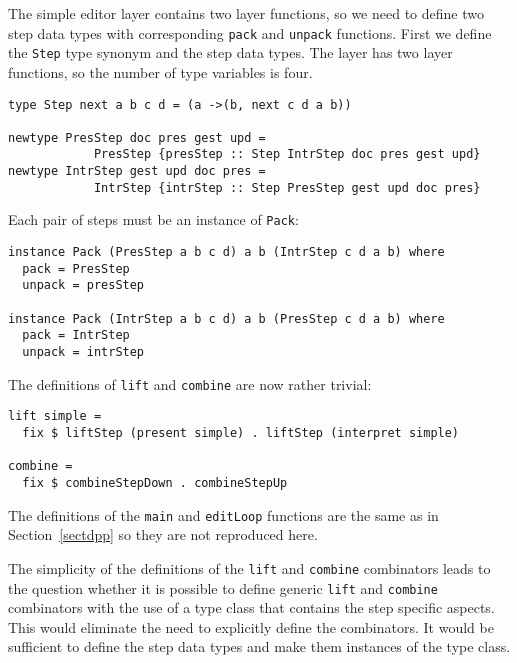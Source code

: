 The simple editor layer contains two layer functions, so we need to define two step data types with corresponding \texttt{pack} and \texttt{unpack} functions. First we define the \texttt{Step} type synonym and the step data types. The layer has two layer functions, so the number of type variables is four.

\begin{small}
\begin{verbatim}
type Step next a b c d = (a ->(b, next c d a b))

newtype PresStep doc pres gest upd = 
            PresStep {presStep :: Step IntrStep doc pres gest upd}
newtype IntrStep gest upd doc pres = 
            IntrStep {intrStep :: Step PresStep gest upd doc pres}
\end{verbatim}
\end{small}

Each pair of steps must be an instance of \texttt{Pack}: 

\begin{small}
\begin{verbatim}
instance Pack (PresStep a b c d) a b (IntrStep c d a b) where
  pack = PresStep
  unpack = presStep

instance Pack (IntrStep a b c d) a b (PresStep c d a b) where
  pack = IntrStep
  unpack = intrStep
\end{verbatim}
\end{small}

The definitions of \texttt{lift} and \texttt{combine} are now rather trivial:

\begin{small}
\begin{verbatim}
lift simple =
  fix $ liftStep (present simple) . liftStep (interpret simple)

combine = 
  fix $ combineStepDown . combineStepUp
\end{verbatim}
\end{small}

The definitions of the \texttt{main} and \texttt{editLoop} functions are the same as in Section~\ref{sectdpp} so they are not reproduced here.



The simplicity of the definitions of the \texttt{lift} and \texttt{combine} combinators leads to the question whether it is possible to define generic \texttt{lift} and \texttt{combine} combinators with the use of a type class that contains the step specific aspects. This would eliminate the need to explicitly define the combinators. It would be sufficient to define the step data types and make them instances of the type class. 

